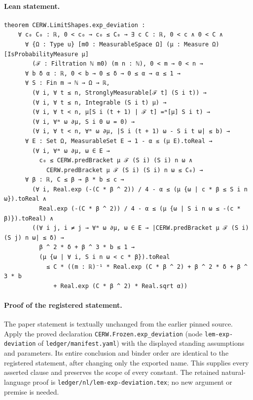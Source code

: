 \paragraph{Lean statement.}
\begin{verbatim}
theorem CERW.LimitShapes.exp_deviation :
    ∀ c₀ C₀ : ℝ, 0 < c₀ → c₀ ≤ C₀ → ∃ c C : ℝ, 0 < c ∧ 0 < C ∧
      ∀ {Ω : Type u} [m0 : MeasurableSpace Ω] (μ : Measure Ω) [IsProbabilityMeasure μ]
        (ℱ : Filtration ℕ m0) (m n : ℕ), 0 < m → 0 < n →
      ∀ b δ α : ℝ, 0 < b → 0 ≤ δ → 0 ≤ α → α ≤ 1 →
      ∀ S : Fin m → ℕ → Ω → ℝ,
        (∀ i, ∀ t ≤ n, StronglyMeasurable[ℱ t] (S i t)) →
        (∀ i, ∀ t ≤ n, Integrable (S i t) μ) →
        (∀ i, ∀ t < n, μ[S i (t + 1) | ℱ t] =ᵐ[μ] S i t) →
        (∀ i, ∀ᵐ ω ∂μ, S i 0 ω = 0) →
        (∀ i, ∀ t < n, ∀ᵐ ω ∂μ, |S i (t + 1) ω - S i t ω| ≤ b) →
      ∀ E : Set Ω, MeasurableSet E → 1 - α ≤ (μ E).toReal →
        (∀ i, ∀ᵐ ω ∂μ, ω ∈ E →
          c₀ ≤ CERW.predBracket μ ℱ (S i) (S i) n ω ∧
            CERW.predBracket μ ℱ (S i) (S i) n ω ≤ C₀) →
      ∀ β : ℝ, C ≤ β → β * b ≤ c →
        (∀ i, Real.exp (-(C * β ^ 2)) / 4 - α ≤ (μ {ω | c * β ≤ S i n ω}).toReal ∧
          Real.exp (-(C * β ^ 2)) / 4 - α ≤ (μ {ω | S i n ω ≤ -(c * β)}).toReal) ∧
        ((∀ i j, i ≠ j → ∀ᵐ ω ∂μ, ω ∈ E → |CERW.predBracket μ ℱ (S i) (S j) n ω| ≤ δ) →
          β ^ 2 * δ + β ^ 3 * b ≤ 1 →
          (μ {ω | ∀ i, S i n ω < c * β}).toReal
            ≤ C * ((m : ℝ)⁻¹ * Real.exp (C * β ^ 2) + β ^ 2 * δ + β ^ 3 * b
              + Real.exp (C * β ^ 2) * Real.sqrt α))
\end{verbatim}
\paragraph{Proof of the registered statement.}
The paper statement is textually unchanged from the earlier pinned source.
Apply the proved declaration \texttt{CERW.Frozen.exp\_deviation}
(node \texttt{lem-exp-deviation} of \texttt{ledger/manifest.yaml}) with the displayed
standing assumptions and parameters. Its entire conclusion and binder order
are identical to the registered statement, after changing only the exported
name. This supplies every asserted clause and preserves the scope of every
constant. The retained natural-language proof is
\texttt{ledger/nl/lem-exp-deviation.tex}; no new argument or premise is needed.
